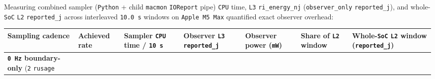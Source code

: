 \documentclass[10pt,letterpaper]{article}
\begin{document}
Measuring combined sampler (\texttt{Python} + child \texttt{macmon}
\texttt{IOReport} pipe) \texttt{CPU} time, \texttt{L3}
\texttt{ri\_\allowbreak{}energy\_\allowbreak{}nj} (\texttt{observer\_\allowbreak{}only} \texttt{reported\_\allowbreak{}j}),
and whole-\texttt{SoC} \texttt{L2} \texttt{reported\_\allowbreak{}j} across
interleaved \texttt{10.0\ s} windows on \texttt{Apple\ M5\ Max}
quantified exact observer overhead:

{\scriptsize\setlength{\tabcolsep}{3.0pt}\renewcommand{\arraystretch}{1.14}
\begin{longtable}[]{@{}
  >{\raggedright\arraybackslash}p{}
  >{\raggedleft\arraybackslash}p{}
  >{\raggedleft\arraybackslash}p{}
  >{\raggedleft\arraybackslash}p{}
  >{\raggedleft\arraybackslash}p{}
  >{\raggedleft\arraybackslash}p{}
  >{\raggedleft\arraybackslash}p{}@{}}
\toprule\noalign{}
\begin{minipage}[b]{\linewidth}\raggedright
\textbf{Sampling cadence}
\end{minipage} & \begin{minipage}[b]{\linewidth}\raggedleft
\textbf{Achieved rate}
\end{minipage} & \begin{minipage}[b]{\linewidth}\raggedleft
\textbf{Sampler \texttt{CPU} time / \texttt{10\ s}}
\end{minipage} & \begin{minipage}[b]{\linewidth}\raggedleft
\textbf{Observer \texttt{L3} \texttt{reported\_\allowbreak{}j}}
\end{minipage} & \begin{minipage}[b]{\linewidth}\raggedleft
\textbf{Observer power (\texttt{mW})}
\end{minipage} & \begin{minipage}[b]{\linewidth}\raggedleft
\textbf{Share of \texttt{L2} window}
\end{minipage} & \begin{minipage}[b]{\linewidth}\raggedleft
\textbf{Whole-\texttt{SoC} \texttt{L2} window (\texttt{reported\_\allowbreak{}j})}
\end{minipage} \\
\midrule\noalign{}
\endhead
\bottomrule\noalign{}
\endlastfoot
\textbf{\texttt{0\ Hz} boundary-only} (\texttt{2} \texttt{rusage}

\end{longtable}}
\end{document}
